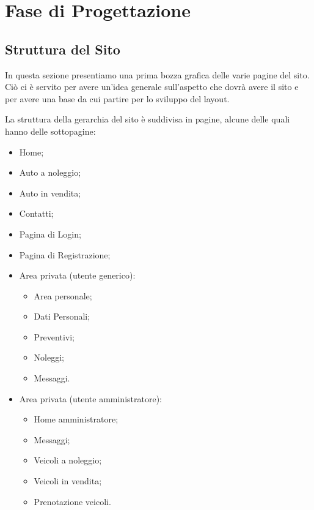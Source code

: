 \section{Fase di Progettazione}
    \subsection{Struttura del Sito}
    In questa sezione presentiamo una prima bozza grafica delle varie pagine del sito. Ciò ci è servito per avere un'idea generale sull'aspetto che dovrà avere il sito e per avere una base da cui partire per lo sviluppo del layout.
        
    La struttura della gerarchia del sito è suddivisa in pagine, alcune delle quali hanno delle sottopagine:
    \begin{itemize}
        \item Home;
        \item Auto a noleggio;
        \item Auto in vendita;
        \item Contatti;
        \item Pagina di Login;
        \item Pagina di Registrazione;
        \item Area privata (utente generico):
            \begin{itemize}
                \item Area personale;
                \item Dati Personali;
                \item Preventivi;
                \item Noleggi;
                \item Messaggi.
            \end{itemize}
            \item Area privata (utente amministratore):
                \begin{itemize}
                    \item Home amministratore;
                    \item Messaggi;
                    \item Veicoli a noleggio;
                    \item Veicoli in vendita;
                    \item Prenotazione veicoli.
                \end{itemize}
    \end{itemize}

